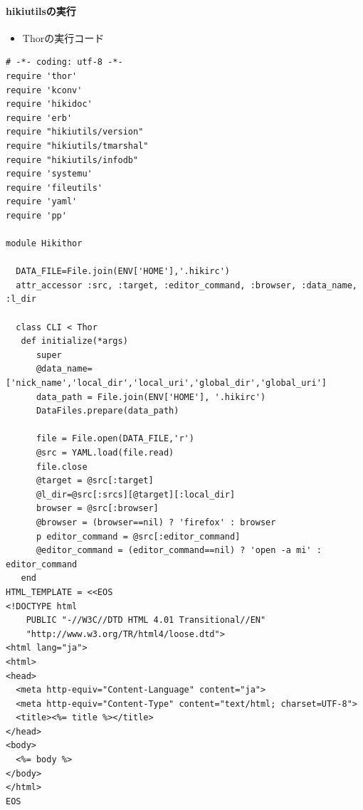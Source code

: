 \paragraph{hikiutilsの実行}
\begin{itemize}
\item Thorの実行コード
\end{itemize}\begin{lstlisting}[style=customRuby]
# -*- coding: utf-8 -*-                                                         
require 'thor'
require 'kconv'
require 'hikidoc'
require 'erb'
require "hikiutils/version"
require "hikiutils/tmarshal"
require "hikiutils/infodb"
require 'systemu'
require 'fileutils'
require 'yaml'
require 'pp'

module Hikithor

  DATA_FILE=File.join(ENV['HOME'],'.hikirc')
  attr_accessor :src, :target, :editor_command, :browser, :data_name, :l_dir

  class CLI < Thor
   def initialize(*args)
      super
      @data_name=['nick_name','local_dir','local_uri','global_dir','global_uri']
      data_path = File.join(ENV['HOME'], '.hikirc')
      DataFiles.prepare(data_path)

      file = File.open(DATA_FILE,'r')
      @src = YAML.load(file.read)
      file.close
      @target = @src[:target]
      @l_dir=@src[:srcs][@target][:local_dir]
      browser = @src[:browser]
      @browser = (browser==nil) ? 'firefox' : browser
      p editor_command = @src[:editor_command]
      @editor_command = (editor_command==nil) ? 'open -a mi' : editor_command
   end
HTML_TEMPLATE = <<EOS
<!DOCTYPE html                                                                  
    PUBLIC "-//W3C//DTD HTML 4.01 Transitional//EN"                             
    "http://www.w3.org/TR/html4/loose.dtd">                                     
<html lang="ja">                                                                
<html>                                                                          
<head>                                                                          
  <meta http-equiv="Content-Language" content="ja">                             
  <meta http-equiv="Content-Type" content="text/html; charset=UTF-8">           
  <title><%= title %></title>                                                   
</head>                                                                         
<body>
  <%= body %>                                                                   
</body>                                                                         
</html>                                                                         
EOS                                                                          
\end{lstlisting}
